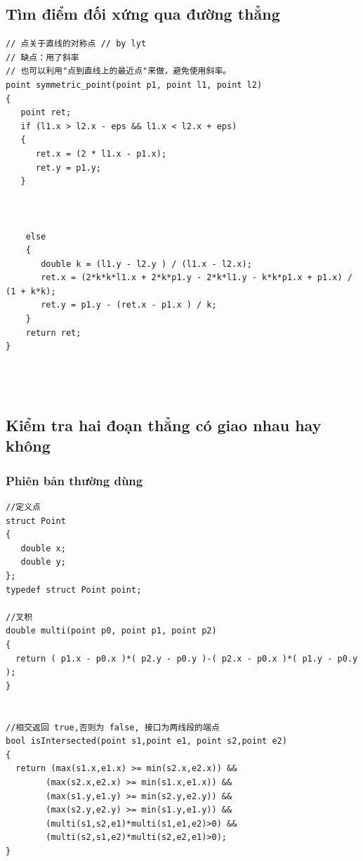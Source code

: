 \documentclass[11pt]{article}
\begin{document}
\subsection{Tìm điểm đối xứng qua đường thẳng}
\begingroup
\scriptsize
\begin{verbatim}
// 点关于直线的对称点 // by lyt
// 缺点：用了斜率
// 也可以利用"点到直线上的最近点"来做，避免使用斜率。
point symmetric_point(point p1, point l1, point l2)
{
   point ret;
   if (l1.x > l2.x - eps && l1.x < l2.x + eps)
   {
      ret.x = (2 * l1.x - p1.x);
      ret.y = p1.y;
   }



    else
    {
       double k = (l1.y - l2.y ) / (l1.x - l2.x);
       ret.x = (2*k*k*l1.x + 2*k*p1.y - 2*k*l1.y - k*k*p1.x + p1.x) / (1 + k*k);
       ret.y = p1.y - (ret.x - p1.x ) / k;
    }
    return ret;
}




\end{verbatim}
\endgroup
\subsection{Kiểm tra hai đoạn thẳng có giao nhau hay không}
\subsubsection{Phiên bản thường dùng}
\begingroup
\scriptsize
\begin{verbatim}
//定义点
struct Point
{
   double x;
   double y;
};
typedef struct Point point;

//叉积
double multi(point p0, point p1, point p2)
{
  return ( p1.x - p0.x )*( p2.y - p0.y )-( p2.x - p0.x )*( p1.y - p0.y );
}


//相交返回 true,否则为 false, 接口为两线段的端点
bool isIntersected(point s1,point e1, point s2,point e2)
{
  return (max(s1.x,e1.x) >= min(s2.x,e2.x)) &&
        (max(s2.x,e2.x) >= min(s1.x,e1.x)) &&
        (max(s1.y,e1.y) >= min(s2.y,e2.y)) &&
        (max(s2.y,e2.y) >= min(s1.y,e1.y)) &&
        (multi(s1,s2,e1)*multi(s1,e1,e2)>0) &&
        (multi(s2,s1,e2)*multi(s2,e2,e1)>0);
}




\end{verbatim}
\endgroup
\end{document}
